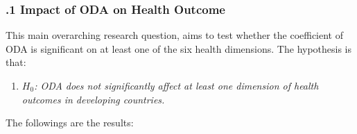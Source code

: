


\subsubsection*{.1  Impact of ODA on Health Outcome} 
This main overarching research question, aims to test whether the coefficient of ODA is significant on at least one of the six health dimensions. The hypothesis is that:
 \begin{enumerate}[i]
    \item \textit{$H_0$: ODA does not significantly affect at least one dimension of health outcomes in developing countries.}
\end{enumerate}
The followings are the results:  
